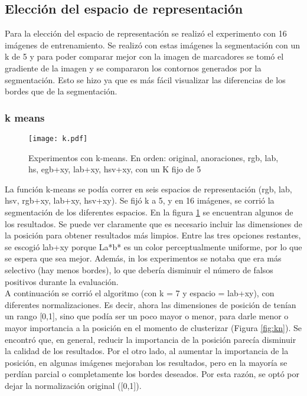 \documentclass[10pt,twocolumn,letterpaper]{article}
\begin{document}
\subsection{Elección del espacio de representación}
Para la elección del espacio de representación se realizó el experimento con 16 imágenes de entrenamiento. Se realizó con estas imágenes la segmentación con un k de 5 y para poder comparar mejor con la imagen de marcadores se tomó el gradiente de la imagen y se compararon los contornos generados por la segmentación. Esto se hizo ya que es más fácil visualizar las diferencias de los bordes que de la segmentación.

\subsubsection{k means}
\begin{figure}[t]
\begin{center}
   \texttt{[image: k.pdf]}
\end{center}
   \caption{Experimentos con k-means. En orden: original, anoraciones, rgb, lab, hs, egb+xy, lab+xy, hsv+xy, con un K fijo de 5}
\label{fig:k}
\end{figure}

La función k-means se podía correr en seis espacios de representación (rgb, lab, hsv, rgb+xy, lab+xy, hsv+xy). Se fijó k a 5, y en 16 imágenes, se corrió la segmentación de los diferentes espacios. En la figura \ref{fig:k} se encuentran algunos de los resultados. Se puede ver claramente que es necesario incluir las dimensiones de la posición para obtener resultados más limpios. Entre las tres opciones restantes, se escogió lab+xy porque La*b* es un color perceptualmente uniforme, por lo que se espera que sea mejor. Además, in los experimentos se notaba que era más selectivo (hay menos bordes), lo que debería disminuir el número de falsos positivos durante la evaluación.
\\
A continuación se corrió el algoritmo (con k =  7 y espacio = lab+xy), con diferentes normalizaciones. Es decir, ahora las dimensiones de posición de tenían un rango [0,1], sino que podía ser un poco mayor o menor, para darle menor o mayor importancia a la posición en el momento de clusterizar (Figura \ref{fig:kn}). Se encontró que, en general, reducir la importancia de la posición parecía disminuir la calidad de los resultados. Por el otro lado, al aumentar la importancia de la posición, en algunas imágenes mejoraban los resultados, pero en la mayoría se perdían parcial o completamente los bordes deseados. Por esta razón, se optó por dejar la normalización original ([0,1]). 
\end{document}
